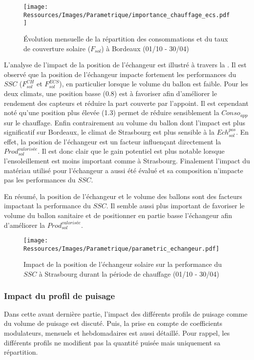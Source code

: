 \begin{figure}
    \centering
    \texttt{[image: Ressources/Images/Parametrique/importance\_chauffage\_ecs.pdf]}
    \caption{Évolution mensuelle de la répartition des consommations et du taux
             de couverture solaire ($F_{sol}$) à Bordeaux (01/10 - 30/04)
             \label{fig:importance_chauffage_ecs}}
\end{figure}

L’analyse de l’impact de la position de l’échangeur est illustré à travers la
. Il est observé que la position de l’échangeur impacte
fortement les performances du $SSC$ ($F_{sol}^{CH}$ et $F_{sol}^{ECS}$), en particulier
lorsque le volume du ballon est faible. Pour les deux climats, une position basse
(\num{0.8}) est à favoriser afin d’améliorer le rendement des capteurs et réduire la part
couverte par l’appoint. Il est cependant noté qu’une position plus élevée (\num{1.3})
permet de réduire sensiblement la $Conso_{app}$ sur le chauffage.
Enfin contrairement au volume du ballon dont l’impact est plus significatif sur Bordeaux, le
climat de Strasbourg est plus sensible à la $Ech_{sol}^{pos}$. En effet, la position de l’échangeur
est un facteur influençant directement la $Prod_{sol}^{valorisée}$. Il est donc clair que le gain potentiel
est plus notable lorsque l’ensoleillement est moins important comme à Strasbourg.
Finalement l’impact du matériau utilisé pour l’échangeur a aussi été évalué et sa
composition n’impacte pas les performances du $SSC$.

En résumé, la position de l’échangeur et le volume des ballons sont des facteurs
impactant la performance du $SSC$. Il semble aussi plus important de favoriser
le volume du ballon sanitaire et de positionner en partie basse l’échangeur afin
d’améliorer la $Prod_{sol}^{valorisée}$.

\begin{figure}
    \centering
    \texttt{[image: Ressources/Images/Parametrique/parametric\_echangeur.pdf]}
    \caption{Impact de la position de l’échangeur solaire sur la performance
             du $SSC$ à Strasbourg durant la période de chauffage (01/10 - 30/04)
             \label{fig:impact_pos_ech}}
\end{figure}


\subsubsection{Impact du profil de puisage} %
\label{ssub:impact_du_profil_de_puisage}
Dans cette avant dernière partie, l’impact des différents profils de puisage comme du
volume de puisage est discuté. Puis, la prise en compte de coefficients modulateurs,
mensuels et hebdomadaires est aussi détaillé. Pour rappel, les différents profils ne
modifient pas la quantité puisée mais uniquement sa répartition.

